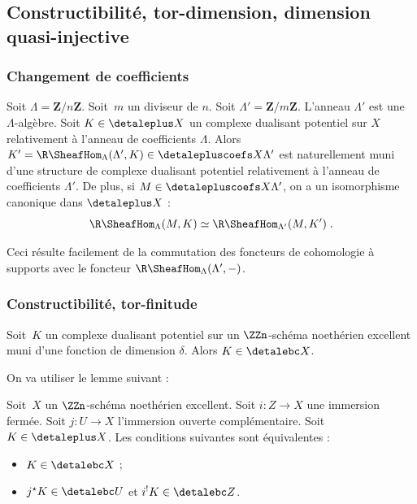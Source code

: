 \documentclass[10pt]{../fichiers-configuration-latex/smfart}
\begin{document}
\subsection{Constructibilité, tor-dimension, dimension quasi-injective}%
\subsubsection{Changement de coefficients}%

\begin{proposition3}\label{17-proposition-cdp-changement-coefficients}
Soit $\Lambda=\mathbf{Z}/n\mathbf{Z}$. Soit $m$ un diviseur de $n$. Soit
$\Lambda'=\mathbf{Z}/m\mathbf{Z}$. L'anneau $\Lambda'$ est une
$\Lambda$-algèbre. Soit $K\in\detaleplus X$ un complexe dualisant potentiel
sur $X$
relativement à l'anneau de coefficients $\Lambda$. Alors
$K'=\R\SheafHom_\Lambda(\Lambda',K)\in\detalepluscoefs X {\Lambda'}$ est
naturellement muni d'une structure de complexe dualisant potentiel
relativement à l'anneau de coefficients $\Lambda'$. De plus, si
$M\in\detalepluscoefs X {\Lambda'}$, on a un isomorphisme canonique dans
$\detaleplus X$ :
\[\R\SheafHom_\Lambda(M,K)\simeq
\R\SheafHom_{\Lambda'}(M,K')\;\text{.}\]
\end{proposition3}

Ceci résulte facilement de la commutation des foncteurs de cohomologie à
supports avec le foncteur $\R\SheafHom_\Lambda(\Lambda',-)$.

\subsubsection{Constructibilité, tor-finitude}%

\begin{proposition3}\label{17-proposition-constructibilite-cdp}
Soit $K$ un complexe dualisant potentiel sur un $\ZZn$-schéma noethérien
excellent muni d'une fonction de dimension $\delta$. Alors $K\in\detalebc X$.
\end{proposition3}

On va utiliser le lemme suivant :

\begin{lemme3}\label{17-lemme-devissage-constructibilite}
Soit $X$ un $\ZZn$-schéma noethérien excellent. Soit $i\colon Z\to X$ une
immersion fermée. Soit $j\colon U\to X$ l'immersion ouverte complémentaire.
Soit $K\in\detaleplus X$. Les conditions suivantes sont équivalentes :
\begin{itemize}
\item $K\in\detalebc X$ ;
\item $j^\star K\in\detalebc U$ et $i^!K\in\detalebc Z$.
\end{itemize}
\end{lemme3}
\end{document}
